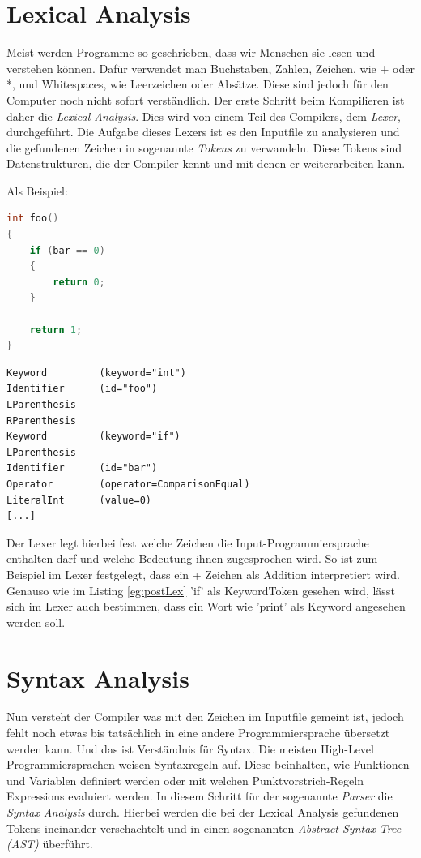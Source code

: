 \section{Lexical Analysis}
Meist werden Programme so geschrieben, dass wir Menschen sie lesen und verstehen können. Dafür verwendet man Buchstaben, Zahlen, Zeichen, wie + oder *, und Whitespaces, wie Leerzeichen oder Absätze.
Diese sind jedoch für den Computer noch nicht sofort verständlich. Der erste Schritt beim Kompilieren ist daher die \textit{Lexical Analysis}. Dies wird von einem Teil des Compilers, dem \textit{Lexer}, durchgeführt.
Die Aufgabe dieses Lexers ist es den Inputfile zu analysieren und die gefundenen Zeichen in sogenannte \textit{Tokens} zu verwandeln. Diese Tokens sind Datenstrukturen, die der Compiler kennt und mit denen er weiterarbeiten kann.

Als Beispiel:

\begin{lstlisting}[language=C, label=eg:preLex, caption=C code vor Lexical Analysis]
int foo()
{
    if (bar == 0)
    {
        return 0;
    }

    return 1;
}
\end{lstlisting}

\begin{lstlisting}[label=eg:postLex, caption=Tokens nach Lexical Analysis]
Keyword         (keyword="int")
Identifier      (id="foo")
LParenthesis
RParenthesis
Keyword         (keyword="if")
LParenthesis
Identifier      (id="bar")
Operator        (operator=ComparisonEqual)
LiteralInt      (value=0)
[...]
\end{lstlisting}

Der Lexer legt hierbei fest welche Zeichen die Input-Programmiersprache enthalten darf und welche Bedeutung ihnen zugesprochen wird. So ist zum Beispiel im Lexer festgelegt, dass ein + Zeichen als Addition interpretiert wird.
Genauso wie im Listing \ref{eg:postLex} 'if' als KeywordToken gesehen wird, lässt sich im Lexer auch bestimmen, dass ein Wort wie 'print' als Keyword angesehen werden soll.

\section{Syntax Analysis}
Nun versteht der Compiler was mit den Zeichen im Inputfile gemeint ist, jedoch fehlt noch etwas bis tatsächlich in eine andere Programmiersprache übersetzt werden kann. Und das ist Verständnis für Syntax.
Die meisten High-Level Programmiersprachen weisen Syntaxregeln auf. Diese beinhalten, wie Funktionen und Variablen definiert werden oder mit welchen Punktvorstrich-Regeln Expressions evaluiert werden.
In diesem Schritt für der sogenannte \textit{Parser} die \textit{Syntax Analysis} durch.
Hierbei werden die bei der Lexical Analysis gefundenen Tokens ineinander verschachtelt und in einen sogenannten \textit{Abstract Syntax Tree (AST)} überführt.

